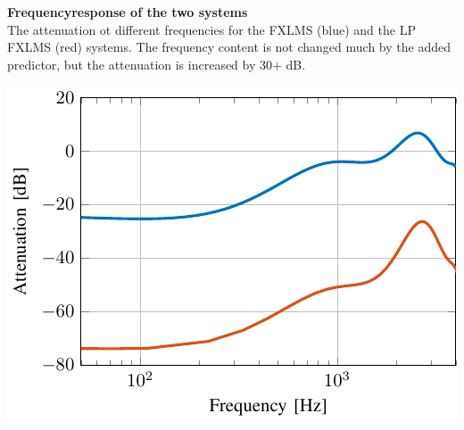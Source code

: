 \begin{minipage}{.4\columnwidth}
	\textbf{Frequencyresponse of the two systems}\\
The attenuation ot different frequencies for the FXLMS (blue) and the LP FXLMS (red) systems. The frequency content is not changed much by the added predictor, but the attenuation is increased by 30+ dB. 
\end{minipage}%
\begin{minipage}{0.5\columnwidth}
	\includegraphics[width=\textwidth]{figures/ComparedConusmerHPOur.pdf}
\end{minipage}


